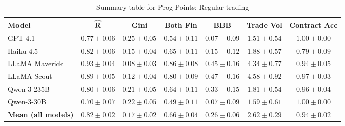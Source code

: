 \documentclass{article} %
\newcommand{\PPC}{Prog-Points\xspace}
\newcommand{\GPT}{GPT-4.1\xspace}
\newcommand{\Haiku}{Haiku-4.5\xspace}
\newcommand{\Maverick}{LLaMA Maverick\xspace}
\newcommand{\Scout}{LLaMA Scout\xspace}
\newcommand{\Qttf}{Qwen-3-235B\xspace}
\newcommand{\Qthirty}{Qwen-3-30B\xspace}
\begin{document}
\begin{table}[t]
\centering
\begin{small}
\begin{tabular}{lcccccc}
\toprule
\textbf{Model}
& \textbf{$\mathbf{\hat{R}}$}
& \textbf{Gini}
& \textbf{Both Fin}
& \textbf{BBB}
& \textbf{Trade Vol}
& \textbf{Contract Acc}
\\
\midrule
\GPT
& $0.77 \pm 0.06$
& $0.25 \pm 0.05$
& $0.54 \pm 0.11$
& $0.07 \pm 0.09$
& $1.51 \pm 0.54$
& $1.00 \pm 0.00$
\\

\Haiku
& $0.82 \pm 0.06$
& $0.15 \pm 0.04$
& $0.65 \pm 0.11$
& $0.15 \pm 0.12$
& $1.88 \pm 0.57$
& $0.79 \pm 0.09$
\\

\Maverick
& $0.93 \pm 0.04$
& $0.08 \pm 0.03$
& $0.86 \pm 0.08$
& $0.45 \pm 0.16$
& $4.34 \pm 0.77$
& $0.94 \pm 0.05$
\\

\Scout
& $0.89 \pm 0.05$
& $0.12 \pm 0.04$
& $0.80 \pm 0.09$
& $0.47 \pm 0.16$
& $4.58 \pm 0.92$
& $0.97 \pm 0.03$
\\

\Qttf
& $0.80 \pm 0.06$
& $0.21 \pm 0.05$
& $0.64 \pm 0.11$
& $0.33 \pm 0.15$
& $1.81 \pm 0.54$
& $0.96 \pm 0.04$
\\

\Qthirty
& $0.70 \pm 0.07$
& $0.22 \pm 0.05$
& $0.49 \pm 0.11$
& $0.07 \pm 0.09$
& $1.59 \pm 0.61$
& $1.00 \pm 0.00$
\\

\midrule
\textbf{Mean (all models)}
& $\mathbf{0.82 \pm 0.02}$
& $\mathbf{0.17 \pm 0.02}$
& $\mathbf{0.66 \pm 0.04}$
& $\mathbf{0.26 \pm 0.06}$
& $\mathbf{2.62 \pm 0.29}$
& $\mathbf{0.94 \pm 0.02}$
\\
\bottomrule
\end{tabular}
\end{small}
\caption{Summary table for \PPC; Regular trading}
\label{tab:}
\end{table}
\end{document}

